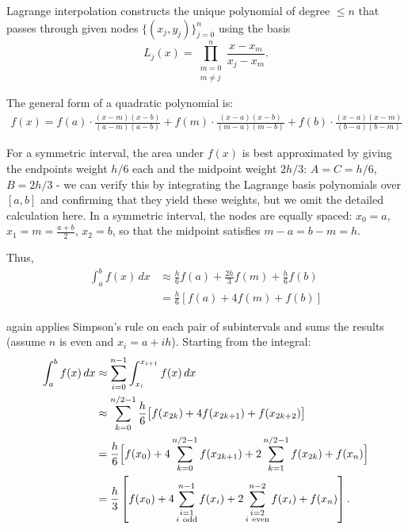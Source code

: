 Lagrange interpolation constructs the unique polynomial of degree \(\le n\) that passes through given nodes $\{(x_j,y_j)\}_{j=0}^n$ using the basis
\begin{equation}
L_j(x)=\prod_{\substack{m=0 \\ m\neq j}}^{n} \frac{x - x_m}{x_j - x_m}.
\end{equation}

The general form of a quadratic polynomial is:
\begin{align*}
    f(x) = f(a) \cdot \frac{(x-m)(x-b)}{(a-m)(a-b)} + f(m) \cdot \frac{(x-a)(x-b)}{(m-a)(m-b)} + f(b) \cdot \frac{(x-a)(x-m)}{(b-a)(b-m)}
\end{align*}


For a symmetric interval, the area under $f(x)$ is best approximated by giving the endpoints weight $h/6$ each and the midpoint weight $2h/3$:
$A = C = h/6$, $B = 2h/3$ - we can verify this by integrating the Lagrange basis polynomials over $[a, b]$ 
and confirming that they yield these weights, but we omit the detailed calculation here.
In a symmetric interval, the nodes are equally spaced: \(x_0=a\), \(x_1=m=\tfrac{a+b}{2}\), \(x_2=b\), so that the midpoint satisfies \(m-a=b-m=h\).

Thus,
\begin{align*}
    \int_a^b f(x) \, dx &\approx \frac{h}{6} f(a) + \frac{2h}{3} f(m) + \frac{h}{6} f(b) \\
    &= \frac{h}{6} [f(a) + 4f(m) + f(b)]
\end{align*}

 again applies Simpson's rule on each pair of subintervals and 
sums the results (assume $n$ is even and $x_i=a+ih$). Starting from the integral:\\


\begin{align*}
    \int_a^b f(x)\, dx &\approx \sum_{i=0}^{n-1} \int_{x_i}^{x_{i+1}} f(x)\, dx \\
    &\approx \sum_{k=0}^{n/2-1} \frac{h}{6}\bigl[f(x_{2k}) + 4f(x_{2k+1}) + f(x_{2k+2})\bigr]\ \\
    &= \frac{h}{6}\Bigl[f(x_0) + 4\sum_{k=0}^{n/2-1} f(x_{2k+1}) + 2\sum_{k=1}^{n/2-1} f(x_{2k}) + f(x_n)\Bigr] \\
    &= \frac{h}{3}\left[f(x_0) + 4\sum_{\substack{i=1\\ i\ \text{odd}}}^{n-1} f(x_i) + 2\sum_{\substack{i=2\\ i\ \text{even}}}^{n-2} f(x_i) + f(x_n)\right].
\end{align*}


